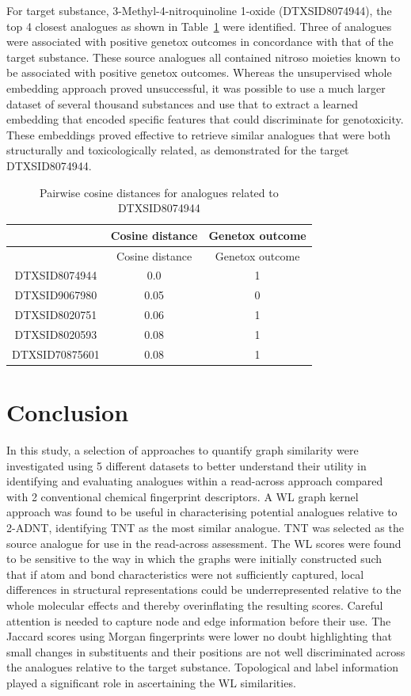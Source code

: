 \documentclass[
  super,
  preprint,
  3p]{elsarticle}
\begin{document}
For target substance, 3-Methyl-4-nitroquinoline 1-oxide (DTXSID8074944),
the top 4 closest analogues as shown in Table~\ref{tbl-gcngen} were
identified. Three of analogues were associated with positive genetox
outcomes in concordance with that of the target substance. These source
analogues all contained nitroso moieties known to be associated with
positive genetox outcomes. Whereas the unsupervised whole embedding
approach proved unsuccessful, it was possible to use a much larger
dataset of several thousand substances and use that to extract a learned
embedding that encoded specific features that could discriminate for
genotoxicity. These embeddings proved effective to retrieve similar
analogues that were both structurally and toxicologically related, as
demonstrated for the target DTXSID8074944.

\begin{longtable}[]{@{}ccc@{}}
\caption{Pairwise cosine distances for analogues related to
DTXSID8074944}\label{tbl-gcngen}\tabularnewline
\toprule\noalign{}
& Cosine distance & Genetox outcome \\
\midrule\noalign{}
\endfirsthead
\toprule\noalign{}
& Cosine distance & Genetox outcome \\
\midrule\noalign{}
\endhead
\bottomrule\noalign{}
\endlastfoot
DTXSID8074944 & 0.0 & 1 \\
DTXSID9067980 & 0.05 & 0 \\
DTXSID8020751 & 0.06 & 1 \\
DTXSID8020593 & 0.08 & 1 \\
DTXSID70875601 & 0.08 & 1 \\
\end{longtable}

\section{Conclusion}\label{conclusion}

In this study, a selection of approaches to quantify graph similarity
were investigated using 5 different datasets to better understand their
utility in identifying and evaluating analogues within a read-across
approach compared with 2 conventional chemical fingerprint descriptors.
A WL graph kernel approach was found to be useful in characterising
potential analogues relative to 2-ADNT, identifying TNT as the most
similar analogue. TNT was selected as the source analogue for use in the
read-across assessment. The WL scores were found to be sensitive to the
way in which the graphs were initially constructed such that if atom and
bond characteristics were not sufficiently captured, local differences
in structural representations could be underrepresented relative to the
whole molecular effects and thereby overinflating the resulting scores.
Careful attention is needed to capture node and edge information before
their use. The Jaccard scores using Morgan fingerprints were lower no
doubt highlighting that small changes in substituents and their
positions are not well discriminated across the analogues relative to
the target substance. Topological and label information played a
significant role in ascertaining the WL similarities.
\end{document}

